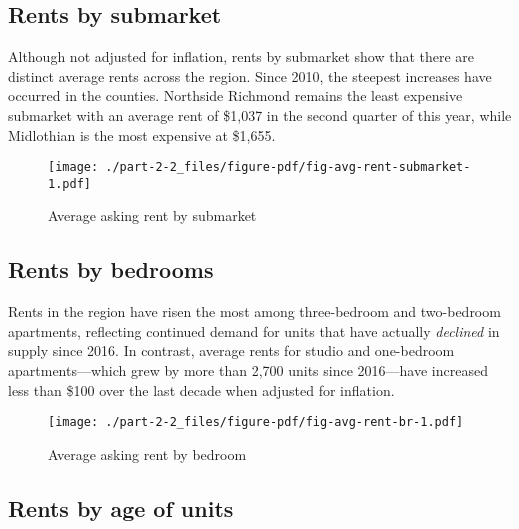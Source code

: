 \documentclass[
  letterpaper,
  DIV=11,
  numbers=noendperiod]{scrreprt}
\begin{document}
\hypertarget{rents-by-submarket}{%
\subsection{Rents by submarket}\label{rents-by-submarket}}

Although not adjusted for inflation, rents by submarket show that there
are distinct average rents across the region. Since 2010, the steepest
increases have occurred in the counties. Northside Richmond remains the
least expensive submarket with an average rent of \$1,037 in the second
quarter of this year, while Midlothian is the most expensive at \$1,655.

\begin{figure}

{\centering \texttt{[image: ./part-2-2\_files/figure-pdf/fig-avg-rent-submarket-1.pdf]}

}

\caption{\label{fig-avg-rent-submarket}Average asking rent by submarket}

\end{figure}

\hypertarget{rents-by-bedrooms}{%
\subsection{Rents by bedrooms}\label{rents-by-bedrooms}}

Rents in the region have risen the most among three-bedroom and
two-bedroom apartments, reflecting continued demand for units that have
actually \emph{declined} in supply since 2016. In contrast, average
rents for studio and one-bedroom apartments---which grew by more than
2,700 units since 2016---have increased less than \$100 over the last
decade when adjusted for inflation.

\begin{figure}

{\centering \texttt{[image: ./part-2-2\_files/figure-pdf/fig-avg-rent-br-1.pdf]}

}

\caption{\label{fig-avg-rent-br}Average asking rent by bedroom}

\end{figure}

\hypertarget{rents-by-age-of-units}{%
\subsection{Rents by age of units}\label{rents-by-age-of-units}}
\end{document}
